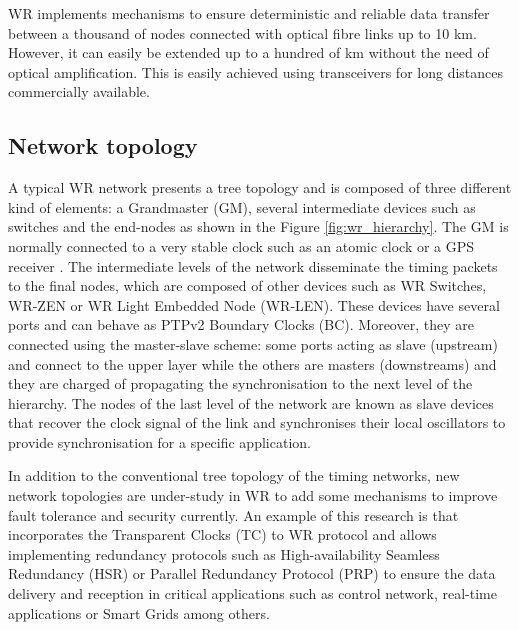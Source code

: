 WR implements mechanisms to ensure deterministic and reliable data transfer
between a thousand of nodes connected with  optical fibre links up to 10 km.
However, it can easily be extended up to a hundred of km without the need of 
optical amplification. This is easily achieved using transceivers for long 
distances commercially available.

\subsection{Network topology} \label{subsec:wr-net}

A typical WR network presents a tree topology and is composed of three different
kind of elements: a Grandmaster (GM), several intermediate devices such as
switches and the end-nodes as shown in the Figure \ref{fig:wr_hierarchy}. The GM
is normally connected to a very stable clock such as an atomic clock or a GPS
receiver \cite{Daniluk2012}. The intermediate levels of the network disseminate
the timing packets to the final nodes, which are composed of other devices such
as WR Switches, WR-ZEN or WR Light Embedded Node (WR-LEN). These devices have
several ports and can behave as PTPv2 Boundary Clocks (BC). Moreover, they are
connected using the master-slave scheme: some ports acting as slave (upstream)
and connect to the upper layer while the others are masters (downstreams) and
they are charged of propagating the synchronisation to the next level of the
hierarchy. The nodes of the last level of the network are known as slave devices
that recover the clock signal of the link and synchronises their local
oscillators to provide synchronisation for a specific application.

In addition to the conventional tree topology of the timing networks, new
network topologies are under-study in WR to add some mechanisms to improve fault
tolerance and security currently. An example of this research is
\cite{jlgutierrez-paper-redundancy} that incorporates the Transparent Clocks
(TC) to WR protocol and allows implementing redundancy protocols such as
High-availability Seamless Redundancy (HSR) or Parallel Redundancy Protocol
(PRP) to ensure the data delivery and reception in critical applications such as
control network, real-time applications or Smart Grids among others.

